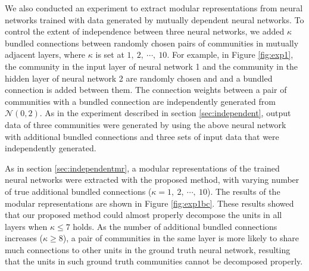 \documentclass[12pt]{article} %
\begin{document}
We also conducted an experiment to extract modular representations from neural networks trained with data generated by mutually dependent neural networks. To control the extent of independence between three neural networks, we added $\kappa$ bundled connections between randomly chosen pairs of communities in mutually adjacent layers, where $\kappa$ is set at $1,\ 2,\ \cdots,\ 10$. For example, in Figure \ref{fig:exp1}, the community in the input layer of neural network 1 and the community in the hidden layer of neural network 2 are randomly chosen and and a bundled connection is added between them. The connection weights between a pair of communities with a bundled connection are independently generated from $\mathcal{N}(0,2)$. As in the experiment described in section \ref{sec:independent}, output data of three communities were generated by using the above neural network with additional bundled connections and three sets of input data that were independently generated. 

As in section \ref{sec:independentmr}, a modular representations of the trained neural networks were extracted with the proposed method, with varying number of true additional bundled connections ($\kappa =1,\ 2,\ \cdots,\ 10$). The results of the modular representations are shown in Figure \ref{fig:exp1bc}. These results showed that our proposed method could almost properly decompose the units in all layers when $\kappa \leq 7$ holds. As the number of additional bundled connections increases ($\kappa \geq 8$), a pair of communities in the same layer is more likely to share much connections to other units in the ground truth neural network, resulting that the units in such ground truth communities cannot be decomposed properly.
\end{document}
